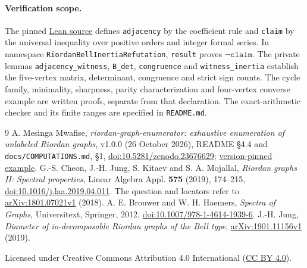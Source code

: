\documentclass[11pt]{article}
\begin{document}
\paragraph{Verification scope.}
The pinned
\href{https://github.com/the-omega-institute/trureturing/blob/79dfe4f731baccd42dd3c56cf6331a0ddd3cafdb/D5/S3/Combinatorics/SpectralGraph/RiordanBellInertiaRefutation.lean}{Lean source}
defines \texttt{adjacency} by the coefficient rule and \texttt{claim}
by the universal inequality over positive orders and integer formal
series. In namespace \texttt{RiordanBellInertiaRefutation},
\texttt{result} proves $\neg\texttt{claim}$.
The private lemmas \texttt{adjacency\_witness}, \texttt{B\_det},
\texttt{congruence} and \texttt{witness\_inertia} establish the
five-vertex matrix, determinant, congruence and strict sign counts.
The cycle family, minimality, sharpness, parity characterization and
four-vertex converse example are written proofs, separate from that
declaration. The exact-arithmetic checker and its finite ranges are
specified in \texttt{README.md}.
\par\endgroup

\begin{thebibliography}{9}
A. Mesinga Mwafise,
\emph{riordan-graph-enumerator: exhaustive enumeration of unlabeled
Riordan graphs}, v1.0.0 (26 October 2026), README \S4.4 and
\texttt{docs/COMPUTATIONS.md}, \S1,
\href{https://doi.org/10.5281/zenodo.23676629}{doi:10.5281/zenodo.23676629};
\href{https://github.com/arnauldmwafise/riordan-graph-enumerator/blob/adef2ec6b5ab78a878911eb514e49188e3eca388/README.md\#44-self-complementary-riordan-graphs}{version-pinned example}.
G.-S. Cheon, J.-H. Jung, S. Kitaev and S. A. Mojallal,
\emph{Riordan graphs II: Spectral properties},
Linear Algebra Appl. \textbf{575} (2019), 174--215,
\href{https://doi.org/10.1016/j.laa.2019.04.011}{doi:10.1016/j.laa.2019.04.011}.
The question and locators refer to
\href{https://arxiv.org/abs/1801.07021v1}{arXiv:1801.07021v1} (2018).
A. E. Brouwer and W. H. Haemers,
\emph{Spectra of Graphs}, Universitext, Springer, 2012,
\href{https://doi.org/10.1007/978-1-4614-1939-6}{doi:10.1007/978-1-4614-1939-6}.
J.-H. Jung, \emph{Diameter of io-decomposable Riordan graphs of the
Bell type}, \href{https://arxiv.org/abs/1901.11156v1}{arXiv:1901.11156v1}
(2019).
\end{thebibliography}
\smallskip
\noindent\small Licensed under Creative Commons Attribution 4.0 International
(\href{https://creativecommons.org/licenses/by/4.0/}{CC BY 4.0}).
\end{document}
